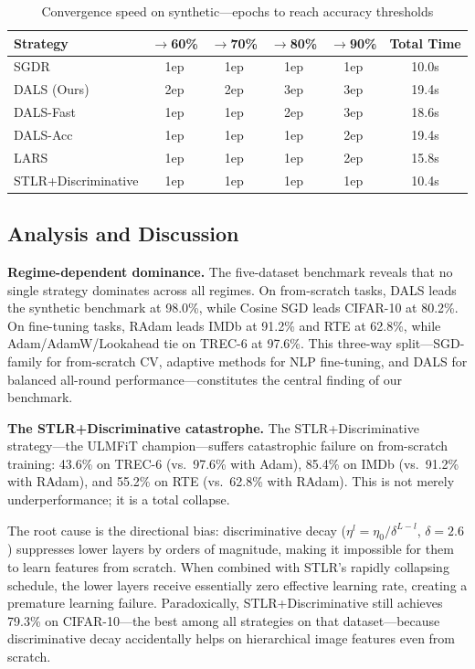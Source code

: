 \documentclass[a4paper,fleqn]{cas-dc}
\begin{document}
\begin{table}[width=.55\textwidth,cols=5,pos=h]
\caption{Convergence speed on synthetic---epochs to reach accuracy thresholds}\label{tab:convergence}
\begin{tabular*}{\tblwidth}{@{} L C C C C C @{}}
\toprule
Strategy & $\to$60\% & $\to$70\% & $\to$80\% & $\to$90\% & Total Time \\
\midrule
SGDR & 1ep & 1ep & 1ep & 1ep & 10.0s \\
DALS (Ours) & 2ep & 2ep & 3ep & 3ep & 19.4s \\
DALS-Fast & 1ep & 1ep & 2ep & 3ep & 18.6s \\
DALS-Acc & 1ep & 1ep & 1ep & 2ep & 19.4s \\
LARS & 1ep & 1ep & 1ep & 2ep & 15.8s \\
STLR+Discriminative & 1ep & 1ep & 1ep & 1ep & 10.4s \\
\bottomrule
\end{tabular*}
\end{table}

\subsection{Analysis and Discussion}\label{sec:analysis}

\textbf{Regime-dependent dominance.} The five-dataset benchmark reveals that no single strategy dominates across all regimes. On from-scratch tasks, DALS leads the synthetic benchmark at 98.0\%, while Cosine SGD leads CIFAR-10 at 80.2\%. On fine-tuning tasks, RAdam leads IMDb at 91.2\% and RTE at 62.8\%, while Adam/AdamW/Lookahead tie on TREC-6 at 97.6\%. This three-way split---SGD-family for from-scratch CV, adaptive methods for NLP fine-tuning, and DALS for balanced all-round performance---constitutes the central finding of our benchmark.

{\sloppy \textbf{The STLR+Discriminative catastrophe.} The STLR+Discriminative strategy---the ULMFiT champion---suffers catastrophic failure on from-scratch training: 43.6\% on TREC-6 (vs.\ 97.6\% with Adam), 85.4\% on IMDb (vs.\ 91.2\% with RAdam), and 55.2\% on RTE (vs.\ 62.8\% with RAdam). This is not merely underperformance; it is a total collapse.

The root cause is the directional bias: discriminative decay ($\eta^l = \eta_0 / \delta^{L-l}$, $\delta=2.6$) suppresses lower layers by orders of magnitude, making it impossible for them to learn features from scratch. When combined with STLR's rapidly collapsing schedule, the lower layers receive essentially zero effective learning rate, creating a premature learning failure. Paradoxically, STLR+Discriminative still achieves 79.3\% on CIFAR-10---the best among all strategies on that dataset---because discriminative decay accidentally helps on hierarchical image features even from scratch.\par}
\end{document}
